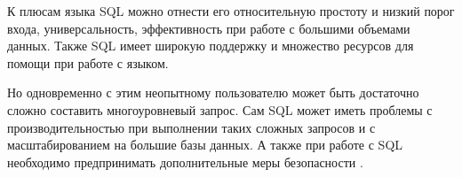 К плюсам языка SQL можно отнести его относительную простоту и низкий порог входа, универсальность, эффективность при работе с большими объемами данных. Также SQL имеет широкую поддержку и множество ресурсов для помощи при работе с языком.

Но одновременно с этим неопытному пользователю может быть достаточно сложно составить многоуровневый запрос. Сам SQL может иметь проблемы с производительностью при выполнении таких сложных запросов и с масштабированием на большие базы данных. А также при работе с SQL необходимо предпринимать дополнительные меры безопасности \cite{7}.
